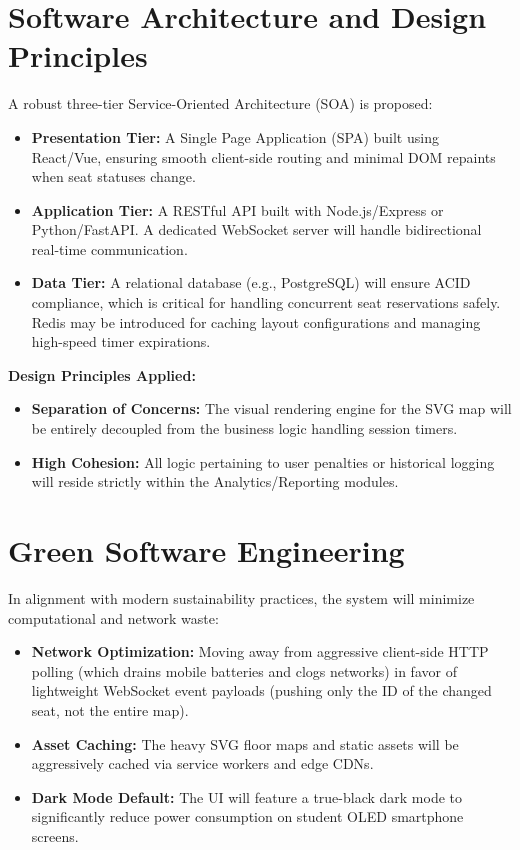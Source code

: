 \documentclass[11pt,a4paper]{article}
\begin{document}
\section{Software Architecture and Design Principles}
A robust three-tier Service-Oriented Architecture (SOA) is proposed:
\begin{itemize}[leftmargin=0.7cm]
    \item \textbf{Presentation Tier:} A Single Page Application (SPA) built using React/Vue, ensuring smooth client-side routing and minimal DOM repaints when seat statuses change.
    \item \textbf{Application Tier:} A RESTful API built with Node.js/Express or Python/FastAPI. A dedicated WebSocket server will handle bidirectional real-time communication.
    \item \textbf{Data Tier:} A relational database (e.g., PostgreSQL) will ensure ACID compliance, which is critical for handling concurrent seat reservations safely. Redis may be introduced for caching layout configurations and managing high-speed timer expirations.
\end{itemize}

\textbf{Design Principles Applied:}
\begin{itemize}[leftmargin=0.7cm]
    \item \textbf{Separation of Concerns:} The visual rendering engine for the SVG map will be entirely decoupled from the business logic handling session timers.
    \item \textbf{High Cohesion:} All logic pertaining to user penalties or historical logging will reside strictly within the Analytics/Reporting modules.
\end{itemize}

\section{Green Software Engineering}
In alignment with modern sustainability practices, the system will minimize computational and network waste:
\begin{itemize}[leftmargin=0.7cm]
    \item \textbf{Network Optimization:} Moving away from aggressive client-side HTTP polling (which drains mobile batteries and clogs networks) in favor of lightweight WebSocket event payloads (pushing only the ID of the changed seat, not the entire map).
    \item \textbf{Asset Caching:} The heavy SVG floor maps and static assets will be aggressively cached via service workers and edge CDNs.
    \item \textbf{Dark Mode Default:} The UI will feature a true-black dark mode to significantly reduce power consumption on student OLED smartphone screens.
\end{itemize}
\end{document}
